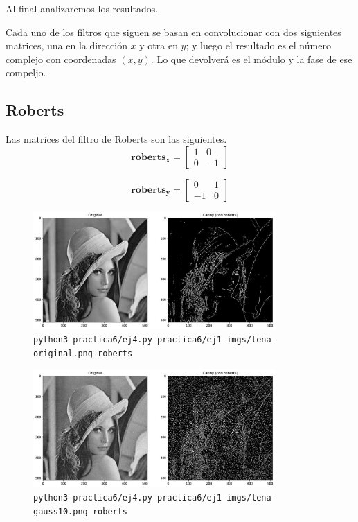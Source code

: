\documentclass[11pt, spanish]{article}
\begin{document}
Al final analizaremos los resultados.

Cada uno de los filtros que siguen se basan en convolucionar con dos siguientes matrices, una en la dirección $x$ y otra en $y$; y luego el resultado es el número complejo con coordenadas $(x,y)$. Lo que devolverá es el módulo y la fase de ese compeljo.



\subsection{Roberts}
Las matrices del filtro de Roberts son las siguientes.
\[
\mathbf{roberts_x} = \begin{bmatrix} 
1 & 0 \\
0 & -1
\end{bmatrix}
\]

\[
\mathbf{roberts_y} = \begin{bmatrix} 
0 & 1 \\
-1 & 0
\end{bmatrix}
\]

\begin{figure}[H]
\centering
    \includegraphics[height=4.5cm]{informe-imgs/ej4-roberts-lena-original.jpg}
    \caption{\texttt{python3 practica6/ej4.py practica6/ej1-imgs/lena-original.png roberts}}
\end{figure}

\begin{figure}[H]
\centering
    \includegraphics[height=4.5cm]{informe-imgs/ej4-roberts-lena-gauss10.jpg}
    \caption{\texttt{python3 practica6/ej4.py practica6/ej1-imgs/lena-gauss10.png roberts}}
\end{figure}
\end{document}
